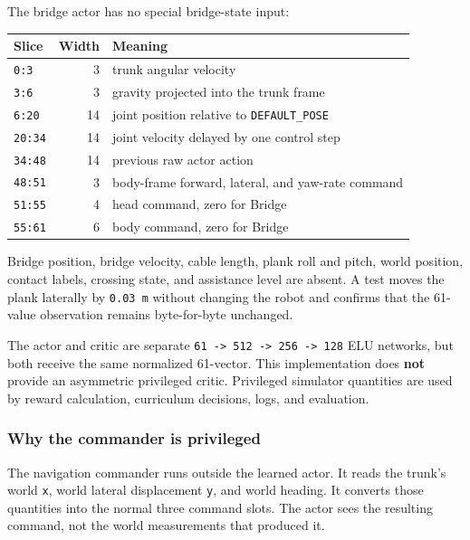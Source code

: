 \documentclass[
  american,
  11pt,
  letterpaper,
]{article}
\newcounter{none} %
\begin{document}
The bridge actor has no special bridge-state input:

{\def\LTcaptype{none} %
\begin{longtable}[]{@{}lrl@{}}
\toprule\noalign{}
Slice & Width & Meaning \\
\midrule\noalign{}
\endhead
\bottomrule\noalign{}
\endlastfoot
\texttt{0:3} & 3 & trunk angular velocity \\
\texttt{3:6} & 3 & gravity projected into the trunk frame \\
\texttt{6:20} & 14 & joint position relative to
\texttt{DEFAULT\_POSE} \\
\texttt{20:34} & 14 & joint velocity delayed by one control step \\
\texttt{34:48} & 14 & previous raw actor action \\
\texttt{48:51} & 3 & body-frame forward, lateral, and yaw-rate
command \\
\texttt{51:55} & 4 & head command, zero for Bridge \\
\texttt{55:61} & 6 & body command, zero for Bridge \\
\end{longtable}
}

Bridge position, bridge velocity, cable length, plank roll and pitch,
world position, contact labels, crossing state, and assistance level are
absent. A test moves the plank laterally by \texttt{0.03\ m} without
changing the robot and confirms that the 61-value observation remains
byte-for-byte unchanged.

The actor and critic are separate
\texttt{61\ -\textgreater{}\ 512\ -\textgreater{}\ 256\ -\textgreater{}\ 128}
ELU networks, but both receive the same normalized 61-vector. This
implementation does \textbf{not} provide an asymmetric privileged
critic. Privileged simulator quantities are used by reward calculation,
curriculum decisions, logs, and evaluation.

\subsubsection{Why the commander is
privileged}\label{why-the-commander-is-privileged}

The navigation commander runs outside the learned actor. It reads the
trunk's world \texttt{x}, world lateral displacement \texttt{y}, and
world heading. It converts those quantities into the normal three
command slots. The actor sees the resulting command, not the world
measurements that produced it.
\end{document}
